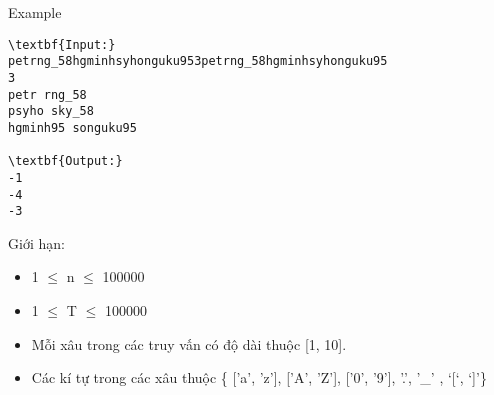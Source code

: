 Example  
\begin{verbatim}
\textbf{Input:}
petrng_58hgminhsyhonguku953petrng_58hgminhsyhonguku95
3
petr rng_58
psyho sky_58
hgminh95 songuku95

\textbf{Output:}
-1
-4
-3

\end{verbatim}
   Giới hạn:  
\begin{itemize}
	\item        1  $\le$  n  $\le$  100000      
	\item          1  $\le$  T  $\le$  100000        
	\item            Mỗi xâu trong các truy vấn có độ dài thuộc [1, 10].          
	\item              Các kí tự trong các xâu thuộc \{ ['a', 'z'], ['A', 'Z'], ['0', '9'], '.', '\_' , ‘[‘, ‘]’\}            
\end{itemize}